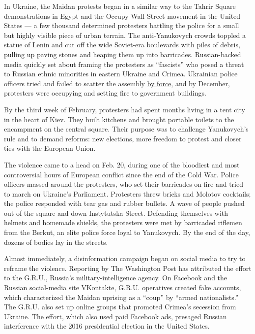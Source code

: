 In Ukraine, the Maidan protests began in a similar way to the Tahrir
Square demonstrations in Egypt and the Occupy Wall Street movement in
the United States --- a few thousand determined protesters battling the
police for a small but highly visible piece of urban terrain. The
anti-Yanukovych crowds toppled a statue of Lenin and cut off the wide
Soviet-era boulevards with piles of debris, pulling up paving stones and
heaping them up into barricades. Russian-backed media quickly set about
framing the protesters as ``fascists'' who posed a threat to Russian
ethnic minorities in eastern Ukraine and Crimea. Ukrainian police
officers tried and failed to scatter the assembly
\href{https://www.nytimes3xbfgragh.onion/2014/01/24/world/europe/ukraine.html}{by
force}, and by December, protesters were occupying and setting fire to
government buildings.

By the third week of February, protesters had spent months living in a
tent city in the heart of Kiev. They built kitchens and brought portable
toilets to the encampment on the central square. Their purpose was to
challenge Yanukovych's rule and to demand reforms: new elections, more
freedom to protest and closer ties with the European Union.

The violence came to a head on Feb. 20, during one of the bloodiest and
most controversial hours of European conflict since the end of the Cold
War. Police officers massed around the protesters, who set their
barricades on fire and tried to march on Ukraine's Parliament.
Protesters threw bricks and Molotov cocktails; the police responded with
tear gas and rubber bullets. A wave of people pushed out of the square
and down Instytutska Street. Defending themselves with helmets and
homemade shields, the protesters were met by barricaded riflemen from
the Berkut, an elite police force loyal to Yanukovych. By the end of the
day, dozens of bodies lay in the streets.

Almost immediately, a disinformation campaign began on social media to
try to reframe the violence. Reporting by The Washington Post has
attributed the effort to the G.R.U., Russia's military-intelligence
agency. On Facebook and the Russian social-media site VKontakte, G.R.U.
operatives created fake accounts, which characterized the Maidan
uprising as a ``coup'' by ``armed nationalists.'' The G.R.U. also set up
online groups that promoted Crimea's secession from Ukraine. The effort,
which also used paid Facebook ads, presaged Russian interference with
the 2016 presidential election in the United States.


